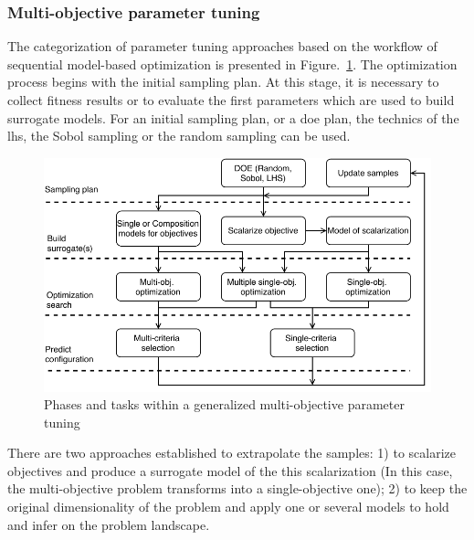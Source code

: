         
        \subsubsection{Multi-objective parameter tuning}

            The categorization of parameter tuning approaches based on the workflow of sequential model-based optimization is presented in Figure.~\ref{fig:mo_param_tuning}. The optimization process begins with the initial sampling plan. At this stage, it is necessary to collect fitness results or to evaluate the first parameters which are used to build surrogate models. For an initial sampling plan, or a \gls{doe} plan, the technics of the \gls{lhs}, the Sobol sampling or the random sampling can be used.
            
            \begin{figure} 
                \centering
                \includegraphics[width=\textwidth]{content/images/tax_mb_tuning}
                \caption[Phases and tasks within a generalized multi-objective parameter tuning]{Phases and tasks within a generalized multi-objective parameter tuning}
                \label{fig:mo_param_tuning}
            \end{figure}

            There are two approaches established to extrapolate the samples: 1) to scalarize objectives and produce a surrogate model of the this scalarization (In this case, the multi-objective problem transforms into a single-objective one); 2) to keep the original dimensionality of the problem and apply one or several models to hold and infer on the problem landscape.

